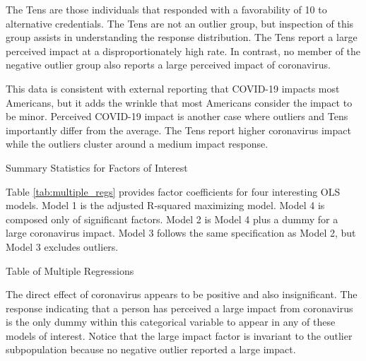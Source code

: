 \documentclass[review]{elsarticle}
\begin{document}
The Tens are those individuals that responded with a favorability of 10 to alternative credentials.
The Tens are not an outlier group, but inspection of this group assists in understanding the response distribution.
The Tens report a large perceived impact at a disproportionately high rate.
In contrast, no member of the negative outlier group also reports a large perceived impact of coronavirus.

This data is consistent with external reporting that COVID-19 impacts most Americans\cite{demographic2020},
but it adds the wrinkle that most Americans consider the impact to be minor.
Perceived COVID-19 impact is another case where outliers and Tens importantly differ from the average.
The Tens report higher coronavirus impact while the outliers cluster around a medium impact response.

\begin{table}
    \caption{Summary Statistics for Factors of Interest}
    \resizebox{\columnwidth}{!}{
        
    }
    \label{tab:desc_stats}
\end{table}

Table \ref{tab:multiple_regs} provides factor coefficients for four interesting OLS models.
Model 1 is the adjusted R-squared maximizing model.
Model 4 is composed only of significant factors.
Model 2 is Model 4 plus a dummy for a large coronavirus impact.
Model 3 follows the same specification as Model 2, but Model 3 excludes outliers.

\begin{table}
    \caption{Table of Multiple Regressions}
    \resizebox{\columnwidth}{!}{
        
    }
    \label{tab:multiple_regs}
\end{table}

The direct effect of coronavirus appears to be positive and also insignificant.
The response indicating that a person has perceived a large impact from coronavirus is the only dummy
within this categorical variable to appear in any of these models of interest.
Notice that the large impact factor is invariant to the outlier subpopulation
because no negative outlier reported a large impact.
\end{document}
